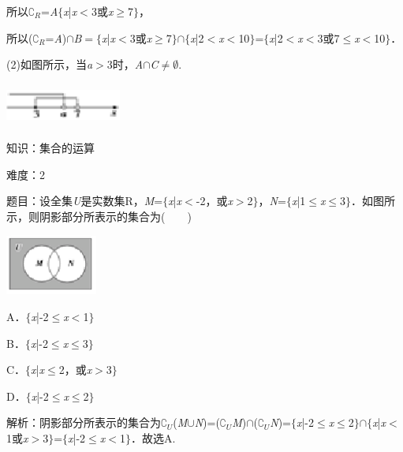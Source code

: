 \documentclass{article} %
\begin{document}
所以$\mathrm{\complement}_{R}$=\textit{A}$\mathrm{\{}$\textit{x}|\textit{x}$\mathrm{<}$3或\textit{x}$\mathrm{\ge}$7$\mathrm{\}}$，

所以($\mathrm{\complement}_{R}$=\textit{A})$\mathrm{\cap}$\textit{B}$=\mathrm{\{}$\textit{x}|\textit{x}$\mathrm{<}$3或\textit{x}$\mathrm{\ge}$7$\mathrm{\}}$$\mathrm{\cap}$$\mathrm{\{}$\textit{x}|2$\mathrm{<}$\textit{x}$\mathrm{<}$10$\mathrm{\}}$=$\mathrm{\{}$\textit{x}|2$\mathrm{<}$\textit{x}$\mathrm{<}$3或7$\mathrm{\le}$\textit{x}$\mathrm{<}$10$\mathrm{\}}$．

(2)如图所示，当\textit{a}$\mathrm{>}$3时，\textit{A}$\mathrm{\cap}$\textit{C}$\mathrm{\neq}$$\mathrm{\emptyset}$.

\includegraphics*[width=1.5in, height=0.56in, keepaspectratio=false]{image15}

知识：集合的运算

难度：2

题目：设全集\textit{U}是实数集R，\textit{M}=$\mathrm{\{}$\textit{x}|\textit{x}$\mathrm{<}$-2，或\textit{x}$\mathrm{>}$2$\mathrm{\}}$，\textit{N}=$\mathrm{\{}$\textit{x}|1$\mathrm{\le}$\textit{x}$\mathrm{\le}$3$\mathrm{\}}$．如图所示，则阴影部分所表示的集合为(　　)

\includegraphics*[width=1.19in, height=0.78in, keepaspectratio=false]{image16}

A．$\mathrm{\{}$\textit{x}|-2$\mathrm{\le}$\textit{x}$\mathrm{<}$1$\mathrm{\}}$   

B．$\mathrm{\{}$\textit{x}|-2$\mathrm{\le}$\textit{x}$\mathrm{\le}$3$\mathrm{\}}$

C．$\mathrm{\{}$\textit{x}|\textit{x}$\mathrm{\le}$2，或\textit{x}$\mathrm{>}$3$\mathrm{\}}$   

D．$\mathrm{\{}$\textit{x}|-2$\mathrm{\le}$\textit{x}$\mathrm{\le}$2$\mathrm{\}}$

解析：阴影部分所表示的集合为$\mathrm{\complement}$\textit{${}_{U}$}(\textit{M}$\mathrm{\cup}$\textit{N})=($\mathrm{\complement}$\textit{${}_{U}$M})$\mathrm{\cap}$($\mathrm{\complement}$\textit{${}_{U}$N})=$\mathrm{\{}$\textit{x}|-2$\mathrm{\le}$\textit{x}$\mathrm{\le}$2$\mathrm{\}}$$\mathrm{\cap}$$\mathrm{\{}$\textit{x}|\textit{x}$\mathrm{<}$1或\textit{x}$\mathrm{>}$3$\mathrm{\}}$=$\mathrm{\{}$\textit{x}|-2$\mathrm{\le}$\textit{x}$\mathrm{<}$1$\mathrm{\}}$．故选A.
\end{document}
